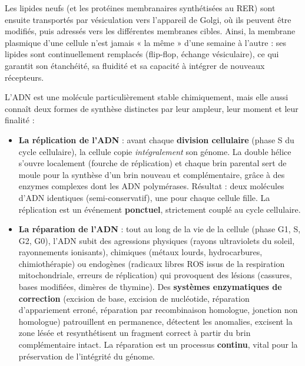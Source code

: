 \documentclass[11pt]{article}
\newcommand{\cle}[1]{{\popxbold\color{popdark}#1}}
\newcounter{popsec}
\newcounter{popsub}
\newcommand{\courssub}[1]{%
  \stepcounter{popsub}%
  \par\vspace{9pt}\noindent{\popxbold\fontsize{11.5}{13}\selectfont\color{popink}{\color{poporange}\thepopsec.\thepopsub}\hspace{6pt}#1}\par\nopagebreak\vspace{4pt}
}
\begin{document}
Les lipides neufs (et les protéines membranaires synthétisées au RER) sont ensuite transportés par vésiculation vers l'\cle{appareil de Golgi}, où ils peuvent être modifiés, puis adressés vers les différentes membranes cibles. Ainsi, la membrane plasmique d'une cellule n'est jamais « la même » d'une semaine à l'autre : ses lipides sont continuellement remplacés (flip-flop, échange vésiculaire), ce qui garantit son étanchéité, sa fluidité et sa capacité à intégrer de nouveaux récepteurs.

\courssub{La réplication et la réparation de l'ADN}

L'ADN est une molécule particulièrement stable chimiquement, mais elle aussi connaît deux formes de synthèse distinctes par leur ampleur, leur moment et leur finalité :

\begin{itemize}
\item \textbf{La réplication de l'ADN} : avant chaque \textbf{division cellulaire} (phase S du cycle cellulaire), la cellule copie \emph{intégralement} son génome. La double hélice s'ouvre localement (fourche de réplication) et chaque brin parental sert de moule pour la synthèse d'un brin nouveau et complémentaire, grâce à des enzymes complexes dont les \cle{ADN polymérases}. Résultat : deux molécules d'ADN identiques (semi-conservatif), une pour chaque cellule fille. La réplication est un événement \textbf{ponctuel}, strictement couplé au cycle cellulaire.
\item \textbf{La réparation de l'ADN} : tout au long de la vie de la cellule (phase G1, S, G2, G0), l'ADN subit des agressions physiques (rayons ultraviolets du soleil, rayonnements ionisants), chimiques (métaux lourds, hydrocarbures, chimiothérapie) ou endogènes (radicaux libres ROS issus de la respiration mitochondriale, erreurs de réplication) qui provoquent des lésions (cassures, bases modifiées, dimères de thymine). Des \textbf{systèmes enzymatiques de correction} (excision de base, excision de nucléotide, réparation d'appariement erroné, réparation par recombinaison homologue, jonction non homologue) patrouillent en permanence, détectent les anomalies, excisent la zone lésée et resynthétisent un fragment correct à partir du brin complémentaire intact. La réparation est un processus \textbf{continu}, vital pour la préservation de l'intégrité du génome.
\end{itemize}
\end{document}
